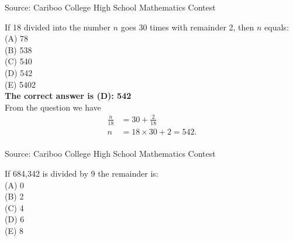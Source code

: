 \documentclass{article}
\begin{document}
\parindent=0cm
\parskip=6pt
\pagestyle{empty}


\scriptsize
Source: Cariboo College High School Mathematics Contest

\normalsize
If 18 divided into the number $n$ goes 30 times with remainder 2, then $n$ equals:\\
(A) 78\\
(B) 538\\
(C) 540\\
(D) 542\\
(E) 5402\\


\textbf{The correct answer is (D): 542}\\[1 ex]
From the question we have
\begin{align*}
\frac{n}{18}&=30+\frac{2}{18}\\
n&=18\times30+2=542.
\end{align*}
\\[5 ex]

\scriptsize
Source: Cariboo College High School Mathematics Contest

\normalsize
If 684,342 is divided by 9 the remainder is:\\
(A) 0\\
(B) 2\\
(C) 4\\
(D) 6\\
(E) 8\\
\end{document}
